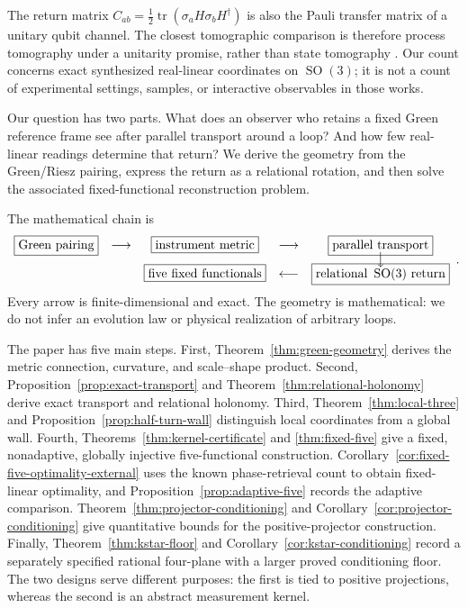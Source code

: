 \documentclass[12pt]{article}
\theoremstyle{definition}
\theoremstyle{remark}
\newcommand{\SO}{\operatorname{SO}}
\newcommand{\tr}{\operatorname{tr}}
\begin{document}
The return matrix $C_{ab}=\tfrac12\tr(\sigma_aH\sigma_bH^\dagger)$ is
also the Pauli transfer matrix of a unitary qubit channel.  The closest
tomographic comparison is therefore process tomography under a unitarity
promise, rather than state tomography
\cite{GutoskiJohnston2014,BaldwinKalevDeutsch2014,DiColandreaEtAl2023}.
Our count concerns exact synthesized real-linear coordinates on $\SO(3)$;
it is not a count of experimental settings, samples, or interactive
observables in those works.

Our question has two parts.  What does an observer who retains a fixed Green
reference frame see after parallel transport around a loop?  And how few
real-linear readings determine that return?  We derive the geometry from the
Green/Riesz pairing, express the return as a relational rotation, and then
solve the associated fixed-functional reconstruction problem.

The mathematical chain is
\[
\begin{array}{ccccc}
\boxed{\text{Green pairing}}&\longrightarrow&
\boxed{\text{instrument metric}}&\longrightarrow&
\boxed{\text{parallel transport}}\\[-1mm]
&&&&\big\downarrow\\[-1mm]
&&\boxed{\text{five fixed functionals}}&\longleftarrow&
\boxed{\text{relational }\SO(3)\text{ return}}
\end{array}.
\]
Every arrow is finite-dimensional and exact.  The geometry is mathematical:
we do not infer an evolution law or physical realization of arbitrary loops.

The paper has five main steps.  First,
Theorem~\ref{thm:green-geometry} derives the metric connection, curvature, and
scale--shape product.  Second, Proposition~\ref{prop:exact-transport} and
Theorem~\ref{thm:relational-holonomy} derive exact transport and relational
holonomy.  Third, Theorem~\ref{thm:local-three} and
Proposition~\ref{prop:half-turn-wall} distinguish local coordinates from a
global wall.  Fourth, Theorems~\ref{thm:kernel-certificate} and
\ref{thm:fixed-five} give a fixed, nonadaptive, globally injective
five-functional construction.  Corollary~\ref{cor:fixed-five-optimality-external}
uses the known phase-retrieval count to obtain fixed-linear optimality, and
Proposition~\ref{prop:adaptive-five} records the adaptive comparison.
 Theorem~\ref{thm:projector-conditioning} and
 Corollary~\ref{cor:projector-conditioning} give quantitative bounds
for the positive-projector construction.  Finally,
Theorem~\ref{thm:kstar-floor} and Corollary~\ref{cor:kstar-conditioning}
record a separately specified rational four-plane with a larger proved
conditioning floor.  The two designs serve different purposes: the first is
tied to positive projections, whereas the second is an abstract measurement
kernel.
\end{document}
